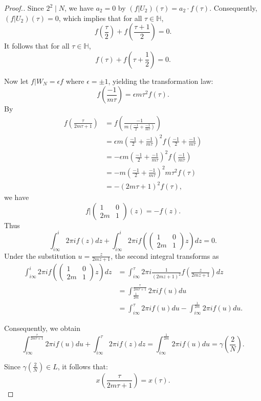 \documentclass[10pt, a4paper]{article}
\begin{document}
\begin{proof}[Proof.]
Since $2^2 \mid N$, we have $a_2 = 0$  by $(f|U_2)(\tau) =
a_2\cdot f(\tau)$. Consequently,  $(f|U_2)(\tau) = 0$, which implies that for all $\tau \in \mathbb{H}$,
\[ f\left(\frac{\tau}{2}\right) + f\left(\frac{\tau + 1}{2}\right) = 0. \]
It follows that for all $\tau \in \mathbb{H}$,
\[ f(\tau) + f\left(\tau + \frac{1}{2}\right) = 0. \]

Now let $f|W_N = \epsilon f$ where $\epsilon = \pm 1$, yielding the transformation law:
\[ f\left(\frac{-1}{m\tau}\right) = \epsilon m\tau^2 f(\tau). \]
By
\begin{align*}
f\left(\frac{\tau}{2m\tau+1}\right) &= f\left(\frac{-1}{m\left(\frac{-1}{2} + \frac{-1}{m\tau}\right)}\right) \\
&= \epsilon m\left(\frac{-1}{2} + \frac{-1}{m\tau}\right)^2 f\left(\frac{-1}{2} + \frac{-1}{m\tau}\right) \\
&= -\epsilon m\left(\frac{-1}{2} + \frac{-1}{m\tau}\right)^2 f\left(\frac{-1}{m\tau}\right) \\
&= -m\left(\frac{-1}{2} + \frac{-1}{m\tau}\right)^2 m\tau^2 f(\tau) \\
&= -(2m\tau+1)^2 f(\tau),
\end{align*}
we have
\[f|\left( {\begin{array}{*{20}{c}}
  1&0 \\
  {2m}&1
\end{array}} \right)(z) =  - f(z).\]
Thus
\[ \int_{i\infty}^{i} 2\pi i f(z)dz + \int_{i\infty}^{i} 2\pi i f\left(\begin{pmatrix} 1 & 0 \\ 2m & 1 \end{pmatrix}z\right) dz = 0. \]
Under the substitution $u = \frac{z}{2mz+1}$, the second integral transforms as
\begin{align*}
\int_{i\infty}^{i} 2\pi i f\left(\begin{pmatrix} 1 & 0 \\ 2m & 1 \end{pmatrix}z\right) dz
& =\int_{i\infty}^{\tau} 2\pi i \frac{1}{(2mz+1)^2} f\left(\frac{z}{2mz+1}\right) dz\\
&= \int_{\frac{1}{2m}}^{\frac{\tau}{2m\tau+1}} 2\pi i f(u) du \\
&= \int_{i\infty}^{\tau} 2\pi i f(u) du - \int_{i\infty}^{\frac{1}{2m}} 2\pi i f(u) du.
\end{align*}

Consequently, we obtain
\[
\int_{i\infty}^{\frac{\tau}{2m\tau+1}} 2\pi i f(u) du + \int_{i\infty}^{\tau} 2\pi i f(z) dz = \int_{i\infty}^{\frac{1}{2m}} 2\pi i f(u) du = \gamma\left(\frac{2}{N}\right).
\]

Since $\gamma\left(\frac{2}{N}\right) \in L$, it follows that:
\[
x\left(\frac{\tau}{2m\tau+1}\right) = x(\tau).
\]
\end{proof}
\end{document}
